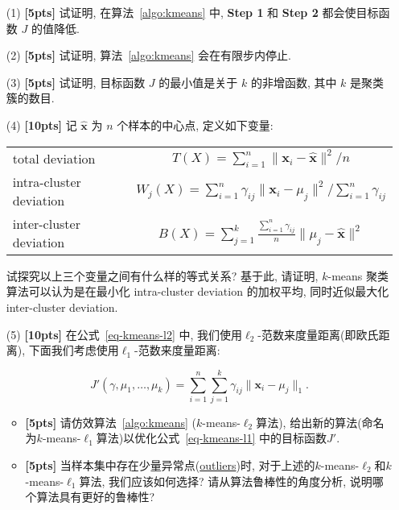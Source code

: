 \documentclass[a4paper,UTF8]{article}
\numberwithin{equation}{section}
\numberwithin{equation}{section}
\theoremstyle{definition}
\begin{document}
\begin{enumerate}

\item[(1)] \textbf{[5pts]} 试证明, 在算法~\ref{algo:kmeans} 中, \textbf{Step 1} 和 \textbf{Step 2} 都会使目标函数 $J$ 的值降低.

\item[(2)] \textbf{[5pts]} 试证明, 算法~\ref{algo:kmeans} 会在有限步内停止.

\item[(3)] \textbf{[5pts]} 试证明, 目标函数 $J$ 的最小值是关于 $k$ 的非增函数, 其中 $k$ 是聚类簇的数目.

\item[(4)] \textbf{[10pts]} 记 $\hat{\mathbf{x}}$ 为 $n$ 个样本的中心点, 定义如下变量:
\begin{table}[h]
\centering
\label{table:equation}
\begin{tabular}{ l | c }
  \hline			
total deviation & $T(X) = \sum_{i=1}^n \lVert \mathbf x_i - \hat{\mathbf x}\rVert^2/n$ \\
intra-cluster deviation & $W_j(X) = \sum_{i=1}^n \gamma_{ij} \lVert\mathbf x_i - \mu_j \rVert^2/\sum_{i=1}^n \gamma_{ij}$ \\
inter-cluster deviation & $B(X) = \sum_{j=1}^k \frac{ \sum_{i=1}^n \gamma_{ij}}{n}  \lVert\mu_j -\hat{\mathbf x} \rVert^2$\\
  \hline  
\end{tabular}
\end{table}

试探究以上三个变量之间有什么样的等式关系? 基于此, 请证明, $k$-means 聚类算法可以认为是在最小化 intra-cluster deviation 的加权平均, 同时近似最大化 inter-cluster deviation.

\item[(5)] \textbf{[10pts]} 在公式~\ref{eq-kmeans-l2} 中, 我们使用$\ell_2$-范数来度量距离(即欧氏距离), 下面我们考虑使用$\ell_1$-范数来度量距离:

\begin{equation}
\label{eq-kmeans-l1}
J'(\gamma, \mu_1,\ldots,\mu_k) = \sum_{i=1}^n \sum_{j=1}^k \gamma_{ij}\|\mathbf x_i - \mu_j\|_1.
\end{equation}

\begin{itemize} 
\item \textbf{[5pts]} 请仿效算法~\ref{algo:kmeans} ($k$-means-$\ell_2$算法), 给出新的算法(命名为$k$-means-$\ell_1$算法)以优化公式~\ref{eq-kmeans-l1} 中的目标函数$J'$.
\item \textbf{[5pts]} 当样本集中存在少量异常点(\href{https://en.wikipedia.org/wiki/Outlier}{outliers})时, 对于上述的$k$-means-$\ell_2$和$k$-means-$\ell_1$算法, 我们应该如何选择? 请从算法鲁棒性的角度分析, 说明哪个算法具有更好的鲁棒性?
\end{itemize}

\end{enumerate}
\end{document}
